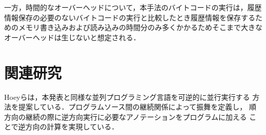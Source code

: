 \documentclass[submit,PRO]{ipsj}
\begin{document}
一方，時間的なオーバーヘッドについて，本手法のバイトコードの実行は，履歴情報保存の必要のないバイトコードの実行と比較したとき履歴情報を保存するためのメモリ書き込みおよび読み込みの時間分のみ多くかかるためそこまで大きなオーバーヘッドは生じないと想定される．


\section{関連研究}

Hoeyらは，本発表と同様な並列プログラミング言語を可逆的に並行実行する
方法を提案している．プログラムソース間の継続関係によって振舞を定義し，
順方向の継続の際に逆方向実行に必要なアノテーションをプログラムに加える
ことで逆方向の計算を実現している．


%
%
%
\end{document}
